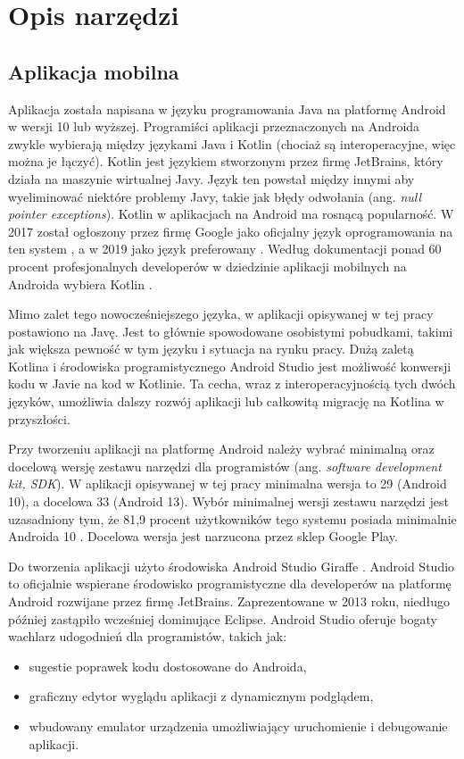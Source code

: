 \documentclass[a4paper,twoside,12pt]{book}
\newcommand{\obcy}[1]{\emph{#1}}
\newcommand{\english}[1]{{\selectlanguage{british}\obcy{#1}}}
\begin{document}
\section{Opis narzędzi}

%
\subsection{Aplikacja mobilna}
Aplikacja została napisana w języku programowania Java na platformę Android w wersji 10 lub wyższej. Programiści aplikacji przeznaczonych na Androida zwykle wybierają między językami Java i Kotlin (chociaż są interoperacyjne, więc można je łączyć). Kotlin jest językiem stworzonym przez firmę JetBrains, który działa na maszynie wirtualnej Javy. Język ten powstał między innymi aby wyeliminować niektóre problemy Javy, takie jak błędy odwołania (ang. \english{null pointer exceptions}). Kotlin w aplikacjach na Android ma rosnącą popularność. W 2017 został ogłoszony przez firmę Google jako oficjalny język oprogramowania na ten system \cite{bib:internetKotlin17}, a w 2019 jako język preferowany \cite{bib:internetKotlin19}. Według dokumentacji ponad 60 procent profesjonalnych developerów w dziedzinie aplikacji mobilnych na Androida wybiera Kotlin \cite{bib:internetKotlin19}.

Mimo zalet tego nowocześniejszego języka, w aplikacji opisywanej w tej pracy postawiono na Javę. Jest to głównie spowodowane osobistymi pobudkami, takimi jak większa pewność w tym języku i sytuacja na rynku pracy. Dużą zaletą Kotlina i środowiska programistycznego Android Studio jest możliwość konwersji kodu w Javie na kod w Kotlinie. Ta cecha, wraz z interoperacyjnością tych dwóch języków, umożliwia dalszy rozwój aplikacji lub całkowitą migrację na Kotlina w przyszłości. 

Przy tworzeniu aplikacji na platformę Android należy wybrać minimalną oraz docelową wersję zestawu narzędzi dla programistów (ang. \english{software development kit, SDK}). W aplikacji opisywanej w tej pracy minimalna wersja to 29 (Android 10), a docelowa 33 (Android 13). Wybór minimalnej wersji zestawu narzędzi jest uzasadniony tym, że 81,9 procent użytkowników tego systemu posiada minimalnie Androida 10 \cite{bib:internetapilevels}. Docelowa wersja jest narzucona przez sklep Google Play. 

Do tworzenia aplikacji użyto środowiska Android Studio Giraffe \cite{bib:androidStudio}. Android Studio to oficjalnie wspierane środowisko programistyczne dla developerów na platformę Android rozwijane przez firmę JetBrains. Zaprezentowane w 2013 roku, niedługo później zastąpiło wcześniej dominujące Eclipse. Android Studio oferuje bogaty wachlarz udogodnień dla programistów, takich jak:
\begin{itemize}
\item sugestie poprawek kodu dostosowane do Androida,
\item graficzny edytor wyglądu aplikacji z dynamicznym podglądem,
\item wbudowany emulator urządzenia umożliwiający uruchomienie i debugowanie aplikacji.
\end{itemize}
 
\end{document}
